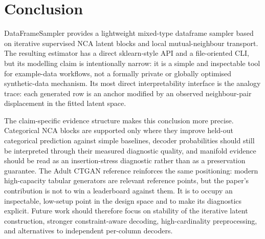 \section{Conclusion}

DataFrameSampler provides a lightweight mixed-type dataframe sampler based
on iterative supervised NCA latent blocks and local mutual-neighbour transport.
The resulting estimator has a direct sklearn-style API and a file-oriented CLI,
but its modelling claim is intentionally narrow: it is a simple and inspectable
tool for example-data workflows, not a formally private or globally optimised
synthetic-data mechanism. Its most direct interpretability interface is the
analogy trace: each generated row is an anchor modified by an observed
neighbour-pair displacement in the fitted latent space.

The claim-specific evidence structure makes this conclusion more precise.
Categorical NCA blocks are supported only where they improve held-out
categorical prediction against simple baselines, decoder probabilities should
still be interpreted through their measured diagnostic quality, and manifold
evidence should be read as an insertion-stress diagnostic rather than as a
preservation guarantee. The Adult CTGAN reference reinforces the same
positioning: modern high-capacity tabular generators are relevant reference
points, but the paper's contribution is not to win a leaderboard against them.
It is to occupy an inspectable, low-setup point in the design space and to make
its diagnostics explicit. Future work should therefore focus on stability of the
iterative latent construction, stronger constraint-aware decoding,
high-cardinality preprocessing, and alternatives to independent per-column
decoders.
